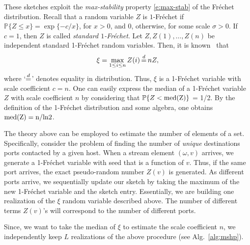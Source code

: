 \documentclass[10pt, conference, letterpaper,onecolumn]{IEEEtranv1.8}
\renewcommand\P{\mathbb P}
\theoremstyle{plain}\newtheorem{thm}{Theorem}\newtheorem{lem}{Lemma}
\theoremstyle{definition}
\begin{document}
 These sketches exploit the {\em max-stability} property \eqref{e:max-stab} of the Fr\'echet distribution.
 Recall that a random variable $Z$ is $1$-Fr\'{e}chet if $\P\{Z \le x\} = \exp\{-c/x\}$, for $x>0$, and
 0, otherwise, for some scale $\sigma>0$. If $c=1$, then $Z$ is called  {\em standard $1$-Fr\'echet}.
 Let $Z, Z(1), \ldots, Z(n)$ be independent standard 1-Fr\'{e}chet random variables. Then, it is known~\cite{4221749} that 
 \begin{equation}\label{e:max-stab}
 \xi = \max_{1\le i \le n} Z(i) \,{\buildrel d \over =}\, nZ,
 \end{equation}
 where `${\buildrel d \over =}$' denotes equality in distribution.
Thus, $\xi$ is a 1-Fr\'{e}chet variable with scale coefficient $c=n$. One can easily express
the median of a 1-Fr\'{e}chet variable $Z$ with scale coefficient $n$ by considering that
$\P\{Z < \rm{med}(Z)\}$ = 1/2. By the definition of the 1-Fr\'{e}chet distribution and some algebra,
one obtains $\rm{med}(Z)=n/{\rm ln}2$.

The theory above can be employed to estimate the number of elements of a set.
Specifically, consider the problem of finding the number of {\em unique} destinations ports
contacted by a given host. When a stream element $(\omega, v)$ arrives, we generate a 1-Fr\'{e}chet
variable with seed that is a function of $v$. Thus,  if the same port arrives, the exact 
pseudo-random number $Z(v)$ is generated. As different ports arrive, we sequentially update 
our sketch by taking the maximum of the new 1-Fr\'{e}chet variable
and the sketch entry. Essentially, we are building one realization of the $\xi$ random variable 
described above.  The number of different terms $Z(v)$'s will correspond to the number of different ports.

Since, we want to take the median of $\xi$ to estimate the scale coefficient $n$,
we independently keep $L$ realizations of the above procedure (see Alg.\ \ref{alg:mshp}).
 
\end{document}
